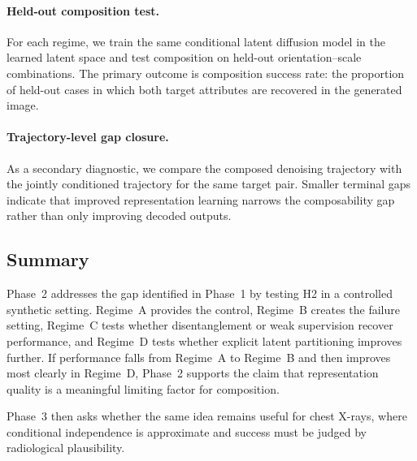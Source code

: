 \paragraph{Held-out composition test.}
For each regime, we train the same conditional latent diffusion model in the learned latent space and test composition on held-out orientation--scale combinations. The primary outcome is composition success rate: the proportion of held-out cases in which both target attributes are recovered in the generated image.


\paragraph{Trajectory-level gap closure.}
As a secondary diagnostic, we compare the composed denoising trajectory with the jointly conditioned trajectory for the same target pair. Smaller terminal gaps indicate that improved representation learning narrows the composability gap rather than only improving decoded outputs.

\subsection{Summary}
\label{subsec:p2_bridge}

Phase~2 addresses the gap identified in Phase~1 by testing H2 in a controlled synthetic setting. Regime~A provides the control, Regime~B creates the failure setting, Regime~C tests whether disentanglement or weak supervision recover performance, and Regime~D tests whether explicit latent partitioning improves further. If performance falls from Regime~A to Regime~B and then improves most clearly in Regime~D, Phase~2 supports the claim that representation quality is a meaningful limiting factor for composition.

Phase~3 then asks whether the same idea remains useful for chest X-rays, where
conditional independence is approximate and success must be judged by radiological plausibility.
